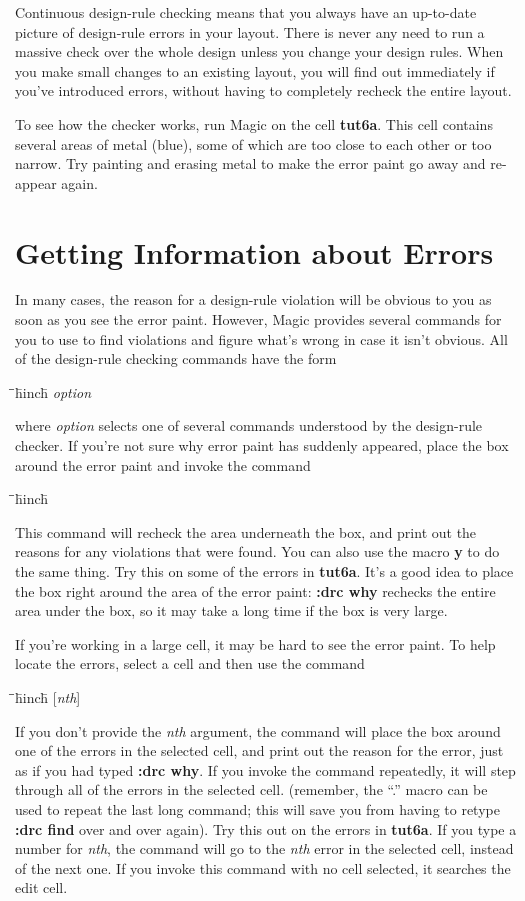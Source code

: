 \documentclass[letterpaper,twoside,12pt]{article}
\def\hinch{\hspace*{0.5in}}
\def\starti{\begin{center}\begin{tabbing}\hinch\=\hinch\=\hinch\=hinch\hinch\=\kill}
\def\endi{\end{tabbing}\end{center}}
\def\ii{\>\>\>}
\begin{document}
Continuous design-rule checking means that
you always have an up-to-date picture
of design-rule errors in your layout.  There is never any need
to run a massive check over the whole design unless you
change your design rules.  When you
make small changes to an existing layout, you will find out
immediately if you've introduced errors, without
having to completely recheck the entire layout.

To see how the checker works, run Magic on the
cell {\bfseries tut6a}.  This cell contains several
areas of metal (blue), some of which are too close to each
other or too narrow.  Try painting and erasing metal to make
the error paint go away and re-appear again.

\section{Getting Information about Errors}

In many cases, the reason for a design-rule violation will
be obvious to you as soon as you see the error paint.
However, Magic provides several commands for you to use
to find violations and figure what's wrong in case it
isn't obvious.  All of the design-rule checking commands
have the form

\starti
   \ii {\bfseries :drc} {\itshape option}
\endi

where {\itshape option} selects one of several commands understood
by the design-rule checker.  If you're not sure why error
paint has suddenly appeared, place the box around the error paint
and invoke the command

\starti
   \ii {\bfseries :drc why}
\endi

This command will recheck the area underneath the box, and print
out the reasons for any violations that were found.  You can
also use the macro {\bfseries y} to do the same thing.  Try this
on some of the errors in {\bfseries tut6a}.  It's a good
idea to place the box right around the area of the error paint:
{\bfseries :drc why} rechecks the entire area under the box, so it
may take a long time if the box is very large.

If you're working in a large cell, it may be hard to see the
error paint.  To help locate the errors, select a cell
and then use the command

\starti
   \ii {\bfseries :drc find} [{\itshape nth}]
\endi

If you don't provide the {\itshape nth} argument,  the command
will place the box around one of the errors in the selected
cell, and print out the reason for the error, just as if you
had typed {\bfseries :drc why}.  If you invoke the command repeatedly,
it will step through all of the errors in the selected cell.
(remember, the ``.'' macro can be used to repeat the last long
command;  this will save you from having to retype {\bfseries :drc find}
over and over again).  Try this out on the errors in {\bfseries tut6a}.
If you type a number for {\itshape nth}, the command will go to the
{\itshape nth} error in the selected cell, instead of the next one.
If you invoke this command with no cell selected, it searches
the edit cell.
\end{document}
